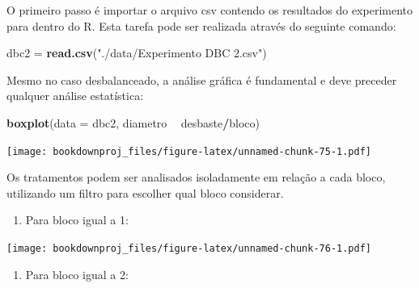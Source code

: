 \documentclass[
]{article}
\newenvironment{Shaded}{\begin{snugshade}}{\end{snugshade}}
\newcommand{\DataTypeTok}[1]{\textcolor[rgb]{0.13,0.29,0.53}{#1}}
\newcommand{\DecValTok}[1]{\textcolor[rgb]{0.00,0.00,0.81}{#1}}
\newcommand{\KeywordTok}[1]{\textcolor[rgb]{0.13,0.29,0.53}{\textbf{#1}}}
\newcommand{\NormalTok}[1]{#1}
\newcommand{\OperatorTok}[1]{\textcolor[rgb]{0.81,0.36,0.00}{\textbf{#1}}}
\newcommand{\StringTok}[1]{\textcolor[rgb]{0.31,0.60,0.02}{#1}}
\providecommand{\tightlist}{%
  \setlength{\itemsep}{0pt}\setlength{\parskip}{0pt}}
\begin{document}
O primeiro passo é importar o arquivo csv contendo os resultados do experimento para dentro do R. Esta tarefa pode ser realizada através do seguinte comando:

\begin{Shaded}
\begin{Highlighting}[]
\NormalTok{dbc2 =}\StringTok{ }\KeywordTok{read.csv}\NormalTok{(}\StringTok{"./data/Experimento DBC 2.csv"}\NormalTok{)}
\end{Highlighting}
\end{Shaded}

Mesmo no caso desbalanceado, a análise gráfica é fundamental e deve preceder qualquer análise estatística:

\begin{Shaded}
\begin{Highlighting}[]
\KeywordTok{boxplot}\NormalTok{(}\DataTypeTok{data =}\NormalTok{ dbc2, diametro }\OperatorTok{~}\StringTok{ }\NormalTok{desbaste}\OperatorTok{/}\NormalTok{bloco)}
\end{Highlighting}
\end{Shaded}

\texttt{[image: bookdownproj\_files/figure-latex/unnamed-chunk-75-1.pdf]}

Os tratamentos podem ser analisados isoladamente em relação a cada bloco, utilizando um filtro para escolher qual bloco considerar.

\begin{enumerate}
\def\labelenumi{\arabic{enumi}.}
\tightlist
\item
  Para bloco igual a 1:
\end{enumerate}

\begin{Shaded}
\end{Shaded}

\texttt{[image: bookdownproj\_files/figure-latex/unnamed-chunk-76-1.pdf]}

\begin{enumerate}
\def\labelenumi{\arabic{enumi}.}
\setcounter{enumi}{1}
\tightlist
\item
  Para bloco igual a 2:
\end{enumerate}
\end{document}
